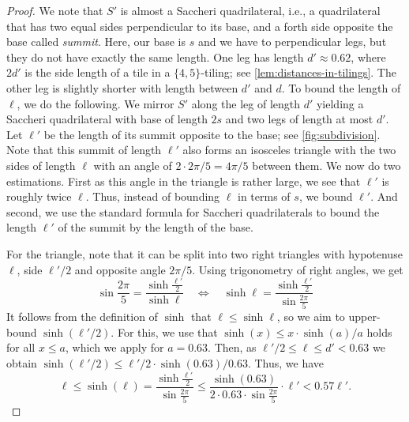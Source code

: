 \documentclass[a4paper,english,cleveref,thm-restate]{lipics-v2021}
\begin{document}
\begin{proof}
    We note that $S'$ is almost a Saccheri quadrilateral, i.e., a quadrilateral that has two equal sides perpendicular to its base, and a forth side opposite the base called \emph{summit}. 
    Here, our base is $ s $ and we have to perpendicular legs, but they do not have exactly the same length.
    One leg has length $ d' \approx 0.62 $, where $ 2d' $ is the side length of a tile in a $ \{ 4, 5\} $-tiling; see \cref{lem:distances-in-tilings}.
    The other leg is slightly shorter with length between $d'$ and $d$.
    To bound the length of $\ell$, we do the following.
    We mirror $S'$ along the leg of length $d'$ yielding a Saccheri quadrilateral with base of length $2s$ and two legs of length at most $d'$.
    Let $\ell'$ be the length of its summit opposite to the base; see \cref{fig:subdivision}.
    Note that this summit of length $\ell'$ also forms an isosceles triangle with the two sides of length $\ell$ with an angle of $2 \cdot 2\pi / 5 = 4 \pi / 5$ between them.
    We now do two estimations.
    First as this angle in the triangle is rather large, we see that $\ell'$ is roughly twice $\ell$.
    Thus, instead of bounding $\ell$ in terms of $s$, we bound $\ell'$.
    And second, we use the standard formula for Saccheri quadrilaterals to bound the length $\ell'$ of the summit by the length of the base.

    For the triangle, note that it can be split into two right triangles with hypotenuse $\ell$, side $\ell'/2$ and opposite angle $2\pi / 5$.
    Using trigonometry of right angles, we get
    \begin{equation*}
        \sin \frac{2 \pi}{5} = \frac{\sinh \frac{\ell'}{2} }{\sinh \ell}
        \quad \iff \quad
        \sinh \ell = \frac{\sinh \frac{\ell'}{2} }{\sin \frac{2 \pi}{5}}
    \end{equation*}
    It follows from the definition of $\sinh$ that $\ell \le \sinh \ell$, so we aim to upper-bound $ \sinh(\ell'/2) $.
    For this, we use that $ \sinh(x) \leq x \cdot \sinh(a) / a $  holds for all $ x \leq a $, which we apply for $ a = 0.63 $.
    Then, as $\ell' / 2 \le \ell \le d' < 0.63$ we obtain $\sinh(\ell' / 2) \le \ell' / 2 \cdot \sinh(0.63) / 0.63$.  Thus, we have
    \begin{equation*}
        \ell \le
        \sinh(\ell) =
        \frac{\sinh \frac{\ell'}{2} }{\sin \frac{2 \pi}{5}} \le
        \frac{\sinh (0.63)}{2 \cdot 0.63 \cdot \sin \frac{2 \pi}{5}} \cdot \ell'
        < 0.57 \ell'.
    \end{equation*}


\end{proof}
\end{document}
